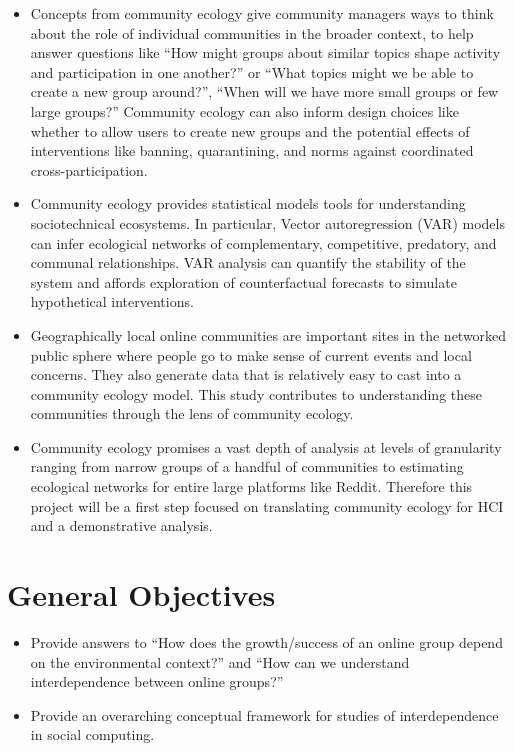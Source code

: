 \documentclass[12pt]{memoir}
\begin{document}
\begin{itemize}
\item Concepts from community ecology give community managers ways to think about the role of individual communities in the broader context, to help answer questions like ``How might groups about similar topics shape activity and participation in one another?'' or ``What topics might we be able to create a new group around?'', ``When will we have more small groups or few large groups?'' Community ecology can also inform design choices like whether to allow users to create new groups and the potential effects of interventions like banning, quarantining, and norms against coordinated cross-participation.

\item Community ecology provides statistical models tools for understanding sociotechnical ecosystems.  In particular, Vector autoregression (VAR) models can infer ecological networks of complementary, competitive, predatory, and communal relationships.  VAR analysis can quantify the stability of the system and affords exploration of counterfactual forecasts to simulate hypothetical interventions. 

\item Geographically local online communities are important sites in the networked public sphere where people go to make sense of current events and local concerns.  They also generate data that is relatively easy to cast into a community ecology model.  This study contributes to understanding these communities through the lens of community ecology.   

\item Community ecology promises a vast depth of analysis at levels of granularity ranging from narrow groups of a handful of communities to estimating ecological networks for entire large platforms like Reddit.  Therefore this project will be a first step focused on translating community ecology for HCI and a demonstrative analysis.  

\end{itemize}

\section{General Objectives}

\begin{itemize}
\item Provide answers to ``How does the growth/success of an online group depend on the environmental context?''  and ``How can we understand interdependence between online groups?''

\item Provide an overarching conceptual framework for studies of interdependence in social computing.

\end{itemize}
\end{document}
